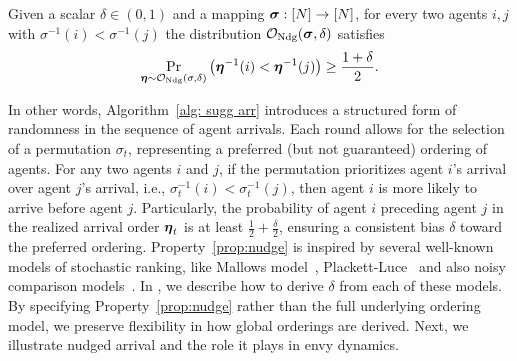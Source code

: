 \begin{property}\label{prop:nudge}
Given a scalar \( \delta \in (0,1) \) and a mapping \( \boldsymbol{\sigma} : [N] \rightarrow [N] \),  for every two agents \( i,j \) with \( \sigma^{-1}(i) < \sigma^{-1}(j) \) the distribution $\mathcal O_{\textnormal{Ndg}}(\boldsymbol{\sigma},\delta)$ satisfies
\begin{equation}\label{def: nudged} 
\Pr_{\boldsymbol{\eta} \sim \mathcal O_{\textnormal{Ndg}}(\sigma,\delta)}\left(\boldsymbol{\eta}^{-1}(i) < \boldsymbol{\eta}^{-1}(j)\right) \geq \frac{1+\delta}{2}. 
\end{equation}  
\end{property}
In other words, Algorithm~\ref{alg: sugg arr} introduces a structured form of randomness in the sequence of agent arrivals. Each round allows for the selection of a permutation $\sigma_t$, representing a preferred (but not guaranteed) ordering of agents. For any two agents $i$ and $j$, if the permutation prioritizes agent $i$'s arrival over agent $j$'s arrival, i.e., $\sigma_t^{-1}(i) < \sigma_t^{-1}(j)$, then agent $i$ is more likely to arrive before agent $j$. Particularly, the probability of agent $i$ preceding agent $j$ in the realized arrival order $\boldsymbol{\eta}_t$ is at least $\frac{1}{2} + \frac{\delta}{2}$, ensuring a consistent bias $\delta$ toward the preferred ordering. Property~\ref{prop:nudge} is inspired by several well-known models of stochastic ranking, like Mallows model~\cite{mallows1957non}, Plackett-Luce~\cite{marden1996analyzing} and also noisy comparison models~\cite{braverman2007noisy}. In \ifnum{}\fi, we describe how to derive $\delta$ from each of these models. By specifying Property~\ref{prop:nudge} rather than the full underlying ordering model, we preserve flexibility in how global orderings are derived.  
Next, we illustrate nudged arrival and the role it plays in envy dynamics.
